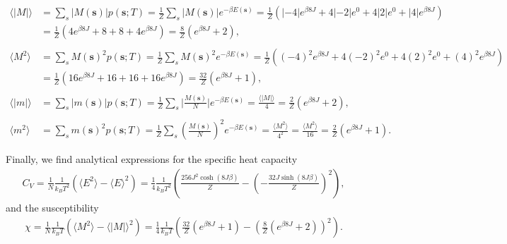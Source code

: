 \documentclass[english,notitlepage,reprint,nofootinbib]{revtex4-1}  %
\begin{document}
\begin{align*}
    \langle |M| \rangle &=  \sum_s |M(\textbf{s})|  p(\textbf{s};T) 
    = \frac{1}{Z} \sum_s |M(\textbf{s})| e^{-\beta E(\textbf{s})} 
    = \frac{1}{Z} \left( |-4|e^{\beta8J} + 4 |-2| e^0 + 4|2|e^0 + |4|e^{\beta 8J}\right) \\
    &= \frac{1}{Z} \left( 4e^{\beta8J} + 8 + 8 + 4e^{\beta 8J}\right)
    = \frac{8}{Z} \left( e^{\beta 8J} + 2 \right),
\\
\\
    \langle M^2 \rangle &= \sum_s M(\textbf{s})^2  p(\textbf{s};T) 
    = \frac{1}{Z} \sum_s M(\textbf{s})^2 e^{-\beta E(\textbf{s})} 
    = \frac{1}{Z} \left( (-4)^2 e^{\beta8J} + 4 (-2)^2 e^0 + 4(2)^2 e^0 + (4)^2 e^{\beta 8J}\right) \\
    &= \frac{1}{Z} \left( 16 e^{\beta8J} + 16 + 16 + 16 e^{\beta 8J}\right)
    = \frac{32}{Z} \left( e^{\beta 8J} + 1 \right),
\\
\\
    \langle |m| \rangle&= \sum_s |m(\textbf{s})|  p(\textbf{s};T) 
    = \frac{1}{Z} \sum_s \bigg| \frac{M(\textbf{s})}{N} \bigg| e^{-\beta E(\textbf{s})}
    = \frac{\langle|M| \rangle}{4}
    = \frac{2}{Z} \left( e^{\beta 8J} + 2 \right),
\\
\\
    \langle m^2 \rangle &= \sum_s m(\textbf{s})^2  p(\textbf{s};T)
    = \frac{1}{Z} \sum_s \left( \frac{M(\textbf{s})}{N} \right)^2 e^{-\beta E(\textbf{s})}
    = \frac{ \langle M^2 \rangle}{4^2}
    = \frac{ \langle M^2 \rangle}{16}
    = \frac{2}{Z} \left( e^{\beta 8J} + 1 \right).
\end{align*}

Finally, we find analytical expressions for the specific heat capacity
\begin{align*}
    C_V = \frac{1}{N} \frac{1}{k_B T^2} \left( \langle E^2 \rangle - \langle E \rangle^2 \right)
    = \frac{1}{4} \frac{1}{k_B T^2} \left( \frac{256 J^2 \cosh(8J \beta)}{Z} - \left( - \frac{32 J \sinh(8J \beta )}{Z} \right)^2 \right)
    ,
\end{align*}
and the susceptibility
\begin{align*}
    \chi = \frac{1}{N} \frac{1}{k_B T} \left( \langle M^2 \rangle - \langle |M| \rangle^2 \right)
    = \frac{1}{4} \frac{1}{k_B T} \left( \frac{32}{Z} \left( e^{\beta 8J} + 1 \right) - \left( \frac{8}{Z} \left( e^{\beta 8J} + 2 \right) \right)^2 \right).
\end{align*}
\end{document}
